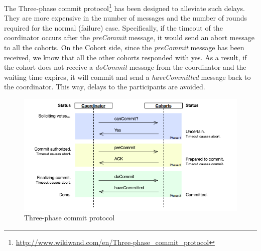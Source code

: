 \documentclass{article}      %
\begin{document}
The Three-phase commit protocol\footnote{\url{http://www.wikiwand.com/en/Three-phase_commit_protocol}} has been designed to alleviate such delays. They are more expensive in the number of messages and the number of rounds required for the normal (failure) case. Specifically, if the timeout of the coordinator occurs after the \emph{preCommit} message, it would send an abort message to all the cohorts. On the Cohort side, since the \emph{preCommit} message has been received, we know that all the other cohorts responded with yes. As a result, if the cohort does not receive a \emph{doCommit} message from the coordinator and the waiting time expires, it will commit and send a \emph{haveCommitted} message back to the coordinator. This way, delays to the participants are avoided.\\ 


\begin{figure}[ht]
\centering
 \includegraphics[scale=.5]{img/Three-phase_commit_diagram}
\caption{Three-phase commit protocol \label{overflow}}
\end{figure}
\end{document}
